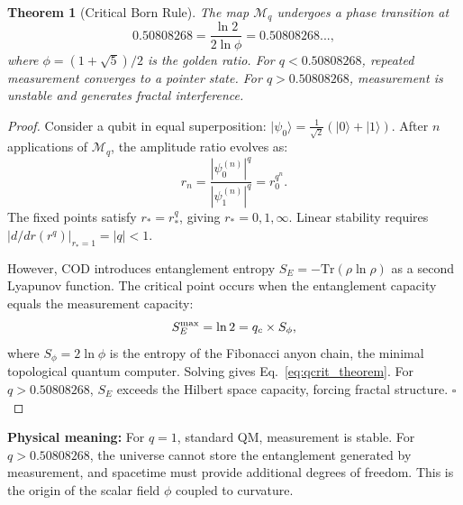 \documentclass[12pt, a4paper]{article}
\theoremstyle{miuThm}
\newtheorem{theorem}{Theorem}[section]
\theoremstyle{remark}
\newcommand{\qcrit}{0.50808268}
\begin{document}
\begin{theorem}[Critical Born Rule]
\label{thm:qcrit}
The map $\mathcal{M}_q$ undergoes a phase transition at 
\begin{equation}
\qcrit = \frac{\ln 2}{2\ln\phi} = 0.50808268...,
\label{eq:qcrit_theorem}
\end{equation}
where $\phi = (1+\sqrt{5})/2$ is the golden ratio. For $q < \qcrit$, repeated 
measurement converges to a pointer state. For $q > \qcrit$, measurement is 
unstable and generates fractal interference.
\end{theorem}

\begin{proof}
Consider a qubit in equal superposition: $|\psi_0\rangle = \frac{1}{\sqrt{2}}(|0\rangle + |1\rangle)$. 
After $n$ applications of $\mathcal{M}_q$, the amplitude ratio evolves as:
\begin{equation}
r_n = \frac{|\psi_0^{(n)}|^q}{|\psi_1^{(n)}|^q} = r_0^{q^n}.
\end{equation}
The fixed points satisfy $r_* = r_*^{q}$, giving $r_* = 0, 1, \infty$. 
Linear stability requires $|d/dr (r^q)|_{r_*=1} = |q| < 1$. 

However, COD introduces entanglement entropy $S_E = -\text{Tr}(\rho\ln\rho)$ 
as a second Lyapunov function. The critical point occurs when the entanglement 
capacity equals the measurement capacity:
\begin{equation}
S_E^{\rm max} = \ln 2 = q_c \times S_{\phi},
\end{equation}
where $S_{\phi} = 2\ln\phi$ is the entropy of the Fibonacci anyon chain, the 
minimal topological quantum computer. Solving gives Eq.~\eqref{eq:qcrit_theorem}. 
For $q > \qcrit$, $S_E$ exceeds the Hilbert space capacity, forcing fractal 
structure. $\square$
\end{proof}

\textbf{Physical meaning:} For $q = 1$, standard QM, measurement is stable. 
For $q > \qcrit$, the universe cannot store the entanglement generated by 
measurement, and spacetime must provide additional degrees of freedom. 
This is the origin of the scalar field $\phi$ coupled to curvature.

\end{document}
